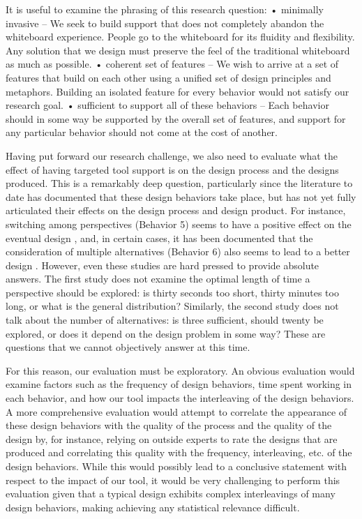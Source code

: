 It is useful to examine the phrasing of this research question:
•	minimally invasive – We seek to build support that does not completely abandon the whiteboard experience. People go to the whiteboard for its fluidity and flexibility. Any solution that we design must preserve the feel of the traditional whiteboard as much as possible.
•	coherent set of features – We wish to arrive at a set of features that build on each other using a unified set of design principles and metaphors. Building an isolated feature for every behavior would not satisfy our research goal. 
•	sufficient to support all of these behaviors – Each behavior should in some way be supported by the overall set of features, and support for any particular behavior should not come at the cost of another. 

Having put forward our research challenge, we also need to evaluate what the effect of having targeted tool support is on the design process and the designs produced. This is a remarkably deep question, particularly since the literature to date has documented that these design behaviors take place, but has not yet fully articulated their effects on the design process and design product. For instance, switching among perspectives (Behavior 5) seems to have a positive effect on the eventual design \cite{baker2010ideas}, and, in certain cases, it has been documented that the consideration of multiple alternatives (Behavior 6) also seems to lead to a better design \cite{buxton2010sketching}. However, even these studies are hard pressed to provide absolute answers. The first study does not examine the optimal length of time a perspective should be explored: is thirty seconds too short, thirty minutes too long, or what is the general distribution? Similarly, the second study does not talk about the number of alternatives: is three sufficient, should twenty be explored, or does it depend on the design problem in some way? These are questions that we cannot objectively answer at this time. 

For this reason, our evaluation must be exploratory. An obvious evaluation would examine factors such as the frequency of design behaviors, time spent working in each behavior, and how our tool impacts the interleaving of the design behaviors. A more comprehensive evaluation would attempt to correlate the appearance of these design behaviors with the quality of the process and the quality of the design by, for instance, relying on outside experts to rate the designs that are produced and correlating this quality with the frequency, interleaving, etc. of the design behaviors. While this would possibly lead to a conclusive statement with respect to the impact of our tool, it would be very challenging to perform this evaluation given that a typical design exhibits complex interleavings of many design behaviors, making achieving any statistical relevance difficult. 

